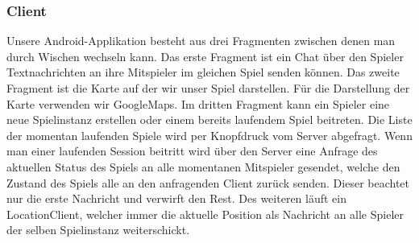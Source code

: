 \subsubsection{Client}
Unsere Android-Applikation besteht aus drei Fragmenten zwischen denen man durch Wischen wechseln kann. Das erste Fragment ist ein Chat über den Spieler Textnachrichten an ihre Mitspieler im gleichen Spiel senden können.
Das zweite Fragment ist die Karte auf der wir unser Spiel darstellen.  
Für die Darstellung der Karte verwenden wir GoogleMaps. 
Im dritten Fragment kann ein Spieler eine neue Spielinstanz erstellen oder einem bereits laufendem Spiel beitreten. Die Liste der momentan laufenden Spiele wird per Knopfdruck vom Server abgefragt. Wenn man einer laufenden Session beitritt wird über den Server eine Anfrage des aktuellen Status des Spiels an alle momentanen Mitspieler gesendet, welche den Zustand des Spiels alle an den anfragenden Client zurück senden. Dieser beachtet nur die erste Nachricht und verwirft den Rest.
Des weiteren läuft ein LocationClient, welcher immer die aktuelle Position als Nachricht an alle Spieler der selben Spielinstanz weiterschickt. 




